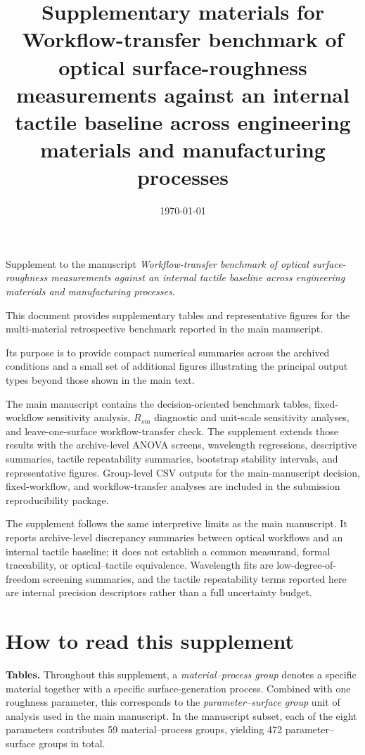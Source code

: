 \documentclass[10pt]{article}
\title{Supplementary materials for\\
Workflow-transfer benchmark of optical surface-roughness measurements against an internal tactile baseline across engineering materials and manufacturing processes}
\author{}
\date{\today}
\begin{document}
\maketitle

\noindent
Supplement to the manuscript \emph{Workflow-transfer benchmark of optical surface-roughness measurements against an internal tactile baseline across engineering materials and manufacturing processes}.

\renewcommand{\thetable}{S\arabic{table}}
\renewcommand{\thefigure}{S\arabic{figure}}
\setcounter{table}{0}
\setcounter{figure}{0}

\noindent
This document provides supplementary tables and representative figures for the multi-material retrospective benchmark reported in the main manuscript.

\medskip
\noindent
Its purpose is to provide compact numerical summaries across the archived conditions and a small set of additional figures illustrating the principal output types beyond those shown in the main text.

\medskip
\noindent
The main manuscript contains the decision-oriented benchmark tables, fixed-workflow sensitivity analysis, $R_{sm}$ diagnostic and unit-scale sensitivity analyses, and leave-one-surface workflow-transfer check. The supplement extends those results with the archive-level ANOVA screens, wavelength regressions, descriptive summaries, tactile repeatability summaries, bootstrap stability intervals, and representative figures. Group-level CSV outputs for the main-manuscript decision, fixed-workflow, and workflow-transfer analyses are included in the submission reproducibility package.

\medskip
\noindent
The supplement follows the same interpretive limits as the main manuscript. It reports archive-level discrepancy summaries between optical workflows and an internal tactile baseline; it does not establish a common measurand, formal traceability, or optical--tactile equivalence. Wavelength fits are low-degree-of-freedom screening summaries, and the tactile repeatability terms reported here are internal precision descriptors rather than a full uncertainty budget.

\tableofcontents
\clearpage

\section{How to read this supplement}
\noindent
\textbf{Tables.} Throughout this supplement, a \emph{material--process group} denotes a specific material together with a specific surface-generation process. Combined with one roughness parameter, this corresponds to the \emph{parameter--surface group} unit of analysis used in the main manuscript. In the manuscript subset, each of the eight parameters contributes 59 material--process groups, yielding 472 parameter--surface groups in total.
\end{document}
